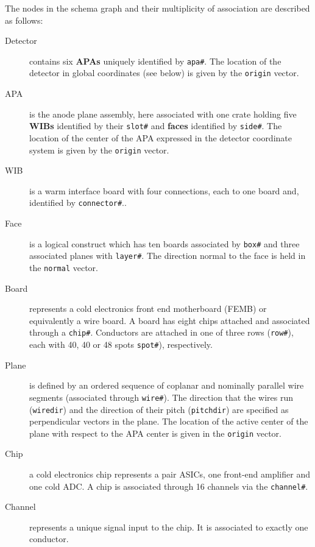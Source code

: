 \documentclass[pdftex,12pt,letter]{article}
\begin{document}
The nodes in the schema graph and their multiplicity of association
are described as follows:

\begin{description}

\item[Detector] contains six \textbf{APAs} uniquely identified by
  \texttt{apa\#}.  The location of the detector in global coordinates
  (see below) is given by the \texttt{origin} vector.

\item[APA] is the anode plane assembly, here associated with one crate
  holding five \textbf{WIBs} identified by their \texttt{slot\#} and
  \textbf{faces} identified by \texttt{side\#}.  The location of the
  center of the APA expressed in the detector coordinate system is
  given by the \texttt{origin} vector.

\item[WIB] is a warm interface board with four connections, each to
  one board and, identified by \texttt{connector\#}..

\item[Face] is a logical construct which has ten boards associated by
  \texttt{box\#} and three associated planes with \texttt{layer\#}.
  The direction normal to the face is held in the \texttt{normal}
  vector.

\item[Board] represents a cold electronics front end motherboard
  (FEMB) or equivalently a wire board.  A board has eight chips
  attached and associated through a \texttt{chip\#}.  Conductors are
  attached in one of three rows (\texttt{row\#}), each with 40, 40 or
  48 spots \texttt{spot\#}), respectively.

\item[Plane] is defined by an ordered sequence of coplanar and
  nominally parallel wire segments (associated through
  \texttt{wire\#}).  The direction that the wires run
  (\texttt{wiredir}) and the direction of their pitch
  (\texttt{pitchdir}) are specified as perpendicular vectors in the
  plane.  The location of the active center of the plane with respect
  to the APA center is given in the \texttt{origin} vector.

\item[Chip] a cold electronics chip represents a pair ASICs, one
  front-end amplifier and one cold ADC.  A chip is associated through
  16 channels via the \texttt{channel\#}.

\item[Channel] represents a unique signal input to the chip.  It is
  associated to exactly one conductor.


\end{description}
\end{document}
